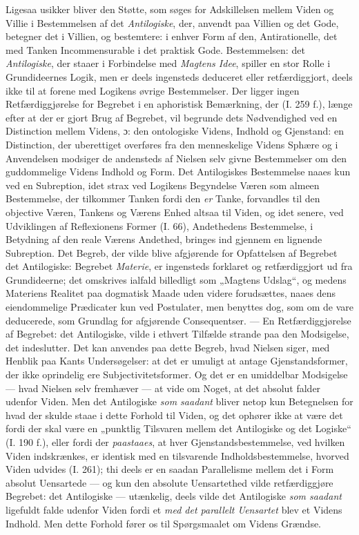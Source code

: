 \documentclass[12pt,a4paper]{book}
\newcommand{\opage}[1]{\marginnote{\footnotesize\textit{[#1]}}}
\begin{document}
Ligesaa usikker bliver den Støtte, som søges for Adskillelsen mellem Viden og Villie i
Bestemmelsen af det \emph{Antilogiske}, der, anvendt paa Villien og det Gode, betegner det
i Villien, og bestemtere: i enhver Form af den, Antirationelle, det med Tanken
Incommensurable i det praktisk Gode. Bestemmelsen: det \emph{Antilogiske}, der staaer i
Forbindelse med \emph{Magtens Idee}, spiller en stor Rolle i Grundideernes Logik, men er
deels ingensteds deduceret eller retfærdiggjort, deels ikke til at forene med Logikens
øvrige Bestemmelser. Der ligger ingen Retfærdiggjørelse for Begrebet i en aphoristisk
Bemærkning, der (I. 259 f.), længe efter at der er gjort Brug af Begrebet, vil begrunde
dets Nødvendighed ved en Distinction mellem Videns, ɔ: den ontologiske Videns, Indhold og
Gjenstand: en Distinction, der uberettiget overføres fra den menneskelige Videns Sphære og
i Anvendelsen modsiger de andensteds af Nielsen selv givne Bestemmelser om den
guddommelige Videns Indhold og Form. Det Antilogiskes Bestemmelse naaes kun ved en
Subreption, idet strax ved Logikens Begyndelse Væren som almeen Bestemmelse, der tilkommer
Tanken fordi den \emph{er} Tanke, forvandles til den objective Væren, Tankens og Værens Enhed
altsaa til Viden, og idet senere, ved Udviklingen af Reflexionens Former (I. 66),
Andethedens Bestemmelse, i Betydning af den reale Værens Andethed, \opage{157}bringes ind gjennem en
lignende Subreption. Det Begreb, der vilde blive afgjørende for Opfattelsen af Begrebet det
Antilogiske: Begrebet \emph{Materie}, er ingensteds forklaret og retfærdiggjort ud fra
Grundideerne; det omskrives ialfald billedligt som „Magtens Udslag“, og medens Materiens
Realitet paa dogmatisk Maade uden videre forudsættes, naaes dens eiendommelige Prædicater
kun ved Postulater, men benyttes dog, som om de vare deducerede, som Grundlag for
afgjørende Consequentser. --- En Retfærdiggjørelse af Begrebet: det Antilogiske, vilde i
ethvert Tilfælde strande paa den Modsigelse, det indeslutter. Det kan anvendes paa dette
Begreb, hvad Nielsen siger, med Henblik paa Kants Undersøgelser: at det er umuligt at
antage Gjenstandsformer, der ikke oprindelig ere Subjectivitetsformer. Og det er en
umiddelbar Modsigelse --- hvad Nielsen selv fremhæver --- at vide om Noget, at det absolut
falder udenfor Viden. Men det Antilogiske \emph{som saadant} bliver netop kun Betegnelsen for hvad
der skulde staae i dette Forhold til Viden, og det ophører ikke at være det fordi der skal
være en „punktlig Tilsvaren mellem det Antilogiske og det Logiske“ (I. 190 f.), eller fordi der \emph{paastaaes}, at hver Gjenstandsbestemmelse, ved hvilken Viden indskrænkes, er identisk
med en tilsvarende Indholdsbestemmelse, hvorved Viden udvides (I. 261); thi deels er en
saadan Parallelisme mellem det i Form absolut Uensartede --- og kun den absolute
Uensartethed vilde retfærdiggjøre Begrebet: det Antilogiske --- utænkelig, deels vilde det
Antilogiske \emph{som saadant} ligefuldt falde udenfor Viden fordi et \emph{med det parallelt Uensartet} blev et Videns Indhold. Men dette Forhold fører os til Spørgsmaalet om Videns Grændse.
\end{document}
